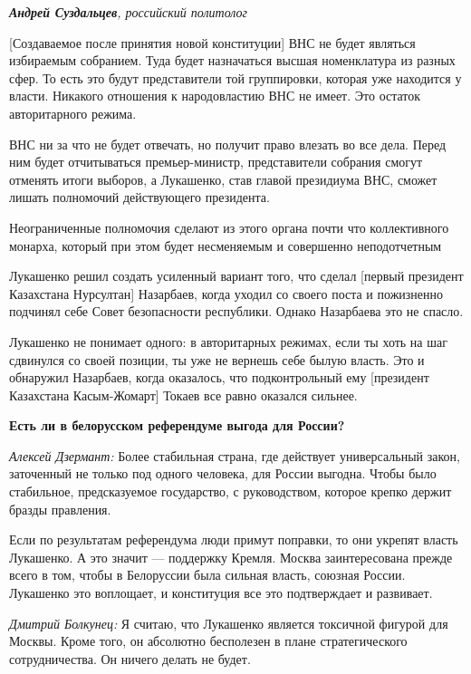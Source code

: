 \textit{\textbf{Андрей Суздальцев}, российский политолог}

[Создаваемое после принятия новой конституции] ВНС не будет являться избираемым собранием. Туда будет назначаться высшая номенклатура из разных сфер. То есть это будут представители той группировки, которая уже находится у власти. Никакого отношения к народовластию ВНС не имеет. Это остаток авторитарного режима.

ВНС ни за что не будет отвечать, но получит право влезать во все дела. Перед ним будет отчитываться премьер-министр, представители собрания смогут отменять итоги выборов, а Лукашенко, став главой президиума ВНС, сможет лишать полномочий действующего президента.

\begin{fancyquotes}
    Неограниченные полномочия сделают из этого органа почти что коллективного монарха, который при этом будет несменяемым и совершенно неподотчетным
\end{fancyquotes}

Лукашенко решил создать усиленный вариант того, что сделал [первый президент Казахстана Нурсултан] Назарбаев, когда уходил со своего поста и пожизненно подчинял себе Совет безопасности республики. Однако Назарбаева это не спасло.

Лукашенко не понимает одного: в авторитарных режимах, если ты хоть на шаг сдвинулся со своей позиции, ты уже не вернешь себе былую власть. Это и обнаружил Назарбаев, когда оказалось, что подконтрольный ему [президент Казахстана Касым-Жомарт] Токаев все равно оказался сильнее.

\textbf{Есть ли в белорусском референдуме выгода для России?}

\textit{Алексей Дзермант:} Более стабильная страна, где действует универсальный закон, заточенный не только под одного человека, для России выгодна. Чтобы было стабильное, предсказуемое государство, с руководством, которое крепко держит бразды правления.

Если по результатам референдума люди примут поправки, то они укрепят власть Лукашенко. А это значит — поддержку Кремля. Москва заинтересована прежде всего в том, чтобы в Белоруссии была сильная власть, союзная России. Лукашенко это воплощает, и конституция все это подтверждает и развивает.

\textit{Дмитрий Болкунец:} Я считаю, что Лукашенко является токсичной фигурой для Москвы. Кроме того, он абсолютно бесполезен в плане стратегического сотрудничества. Он ничего делать не будет.

